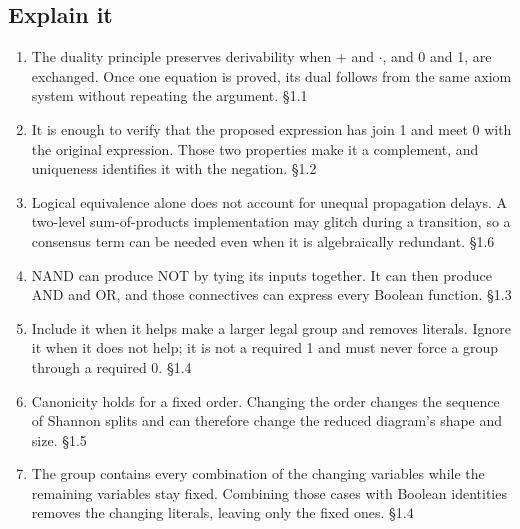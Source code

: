 \documentclass[11pt]{article}
\begin{document}
\begin{keepsection}\subsection{Explain it}

\begin{enumerate}
\item The duality principle preserves derivability when + and \ensuremath{\cdot}, and 0 and 1, are exchanged. Once one equation is proved, its dual follows from the same axiom system without repeating the argument. \hfill{\small\color{FAUblue}§1.1}
\item It is enough to verify that the proposed expression has join 1 and meet 0 with the original expression. Those two properties make it a complement, and uniqueness identifies it with the negation. \hfill{\small\color{FAUblue}§1.2}
\item Logical equivalence alone does not account for unequal propagation delays. A two-level sum-of-products implementation may glitch during a transition, so a consensus term can be needed even when it is algebraically redundant. \hfill{\small\color{FAUblue}§1.6}
\item NAND can produce NOT by tying its inputs together. It can then produce AND and OR, and those connectives can express every Boolean function. \hfill{\small\color{FAUblue}§1.3}
\item Include it when it helps make a larger legal group and removes literals. Ignore it when it does not help; it is not a required 1 and must never force a group through a required 0. \hfill{\small\color{FAUblue}§1.4}
\item Canonicity holds for a fixed order. Changing the order changes the sequence of Shannon splits and can therefore change the reduced diagram’s shape and size. \hfill{\small\color{FAUblue}§1.5}
\item The group contains every combination of the changing variables while the remaining variables stay fixed. Combining those cases with Boolean identities removes the changing literals, leaving only the fixed ones. \hfill{\small\color{FAUblue}§1.4}
\end{enumerate}

\end{keepsection}
\end{document}
